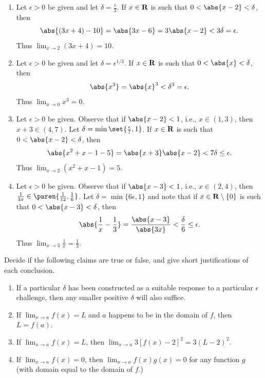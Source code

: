 \documentclass{lew98_solutions}
\begin{document}
\begin{solution}
    \begin{enumerate}
        \item Let \( \epsilon > 0 \) be given and let \( \delta = \tfrac{\epsilon}{3} \). If \( x \in \mathbf{R} \) is such that \( 0 < \abs{x - 2} < \delta \), then
        \[
            \abs{(3x + 4) - 10} = \abs{3x - 6} = 3 \abs{x - 2} < 3 \delta = \epsilon.
        \]
        Thus \( \lim_{x \to 2} (3x + 4) = 10 \).

        \item Let \( \epsilon > 0 \) be given and let \( \delta = \epsilon^{1/3} \). If \( x \in \mathbf{R} \) is such that \( 0 < \abs{x} < \delta \), then
        \[
            \abs{x^3} = \abs{x}^3 < \delta^3 = \epsilon.
        \]
        Thus \( \lim_{x \to 0} x^3 = 0 \).

        \item Let \( \epsilon > 0 \) be given. Observe that if \( \abs{x - 2} < 1 \), i.e., \( x \in (1, 3) \), then \( x + 3 \in (4, 7) \). Let \( \delta = \min \set{ \tfrac{\epsilon}{7}, 1 } \). If \( x \in \mathbf{R} \) is such that \( 0 < \abs{x - 2} < \delta \), then
        \[
            \abs{x^2 + x - 1 - 5} = \abs{x + 3} \abs{x - 2} < 7 \delta \leq \epsilon.
        \]
        Thus \( \lim_{x \to 2} (x^2 + x - 1) = 5 \).

        \item Let \( \epsilon > 0 \) be given. Observe that if \( \abs{x - 3} < 1 \), i.e., \( x \in (2, 4) \), then \( \tfrac{1}{3x} \in \paren{ \tfrac{1}{12}, \tfrac{1}{6} } \). Let \( \delta = \min \{ 6 \epsilon, 1 \} \) and note that if \( x \in \mathbf{R} \setminus \{ 0 \} \) is such that \( 0 < \abs{x - 3} < \delta \), then
        \[
            \abs{\frac{1}{x} - \frac{1}{3}} = \frac{\abs{x - 3}}{\abs{3x}} < \frac{\delta}{6} \leq \epsilon.
        \]
        Thus \( \lim_{x \to 3} \tfrac{1}{x} = \tfrac{1}{3} \).
    \end{enumerate}
\end{solution}

\begin{exercise}
\label{ex:4.2.6}
    Decide if the following claims are true or false, and give short justifications of each conclusion.
    \begin{enumerate}
        \item If a particular \( \delta \) has been constructed as a suitable response to a particular \( \epsilon \) challenge, then any smaller positive \( \delta \) will also suffice.

        \item If \( \lim_{x \to a} f(x) = L \) and \( a \) happens to be in the domain of \( f \), then \( L = f(a) \).

        \item If \( \lim_{x \to a} f(x) = L \), then \( \lim_{x \to a} 3[f(x) - 2]^2 = 3(L - 2)^2 \).

        \item If \( \lim_{x \to a} f(x) = 0 \), then \( \lim_{x \to a} f(x) g(x) = 0 \) for any function \( g \) (with domain equal to the domain of \( f \).)
    \end{enumerate}
\end{exercise}
\end{document}

